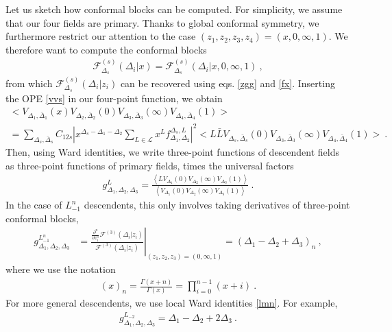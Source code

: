 \documentclass[12pt, a4paper, notitlepage, twoside]{report}
\numberwithin{equation}{section}
\theoremstyle{break}
\begin{document}
Let us sketch how conformal blocks can be computed. 
For simplicity, we assume that our four fields are primary.
Thanks to global conformal symmetry, we furthermore restrict our attention to the case $(z_1,z_2,z_3,z_4)=(x,0,\infty, 1)$. 
We therefore want to compute the conformal blocks 
\begin{align}
 \mathcal{F}^{(s)}_{\Delta_s}(\Delta_i|x)=\mathcal{F}^{(s)}_{\Delta_s}(\Delta_i|x,0,\infty,1)\ ,
\end{align}
from which $\mathcal{F}^{(s)}_{\Delta_s}(\Delta_i|z_i)$ can be recovered  using eqs. \eqref{zgg} and \eqref{fx}.
Inserting the OPE \eqref{vvs} in our four-point function, we obtain
\begin{multline}
 \Big< V_{\Delta_1,\bar\Delta_1}(x) V_{\Delta_2,\bar\Delta_2}(0)V_{\Delta_3,\bar\Delta_3}(\infty)V_{\Delta_4,\bar\Delta_4}(1)\Big>
 \\
 = 
 \sum_{\Delta_s,\bar\Delta_s} C_{12s} 
 \left| x^{\Delta_s-\Delta_1-\Delta_2}\sum_{L\in\mathcal{L}} x^Lf^{\Delta_s,L}_{\Delta_1,\Delta_2} \right|^2
 \Big< L\bar L V_{\Delta_s,\bar\Delta_s}(0) V_{\Delta_3,\bar\Delta_3}(\infty) V_{\Delta_4,\bar\Delta_4}(1) \Big>\ .
 \label{4ope}
\end{multline}
Then, using Ward identities, we write three-point functions of descendent fields as three-point functions of primary fields, times the universal factors
\begin{align}
g^{L}_{\Delta_1,\Delta_2,\Delta_3} = 
 \frac{ \left< L V_{\Delta_1}(0)V_{\Delta_2}(\infty)V_{\Delta_3}(1)\right> }{  \left<  V_{\Delta_1}(0)V_{\Delta_2}(\infty)V_{\Delta_3}(1)\right>}\ .
 \label{glvv}
\end{align}
In the case of $L_{-1}^n$ descendents, this only involves taking derivatives of three-point conformal blocks, 
\begin{align}
 g^{L_{-1}^n}_{\Delta_1,\Delta_2,\Delta_3} & =\left. \frac{\frac{\partial^n}{\partial z_1^n} \mathcal{F}^{(3)}(\Delta_i|z_i)}{\mathcal{F}^{(3)}(\Delta_i|z_i)}\right|_{(z_1,z_2,z_3)=(0,\infty,1)} =(\Delta_1-\Delta_2+\Delta_3)_n \ ,
 \label{gln}
\end{align}
where we use the notation
\begin{align}
 (x)_n = \frac{\Gamma(x+n)}{\Gamma(x)} = \prod_{i=0}^{n-1}(x+i)\ .
\label{xn}
\end{align}
For more general descendents, we use local Ward identities \eqref{lmn}. For example,
\begin{align}
 g^{L_{-2}}_{\Delta_1,\Delta_2,\Delta_3}
 = \Delta_1-\Delta_2+2\Delta_3\ .
 \label{glt}
\end{align}
\end{document}

